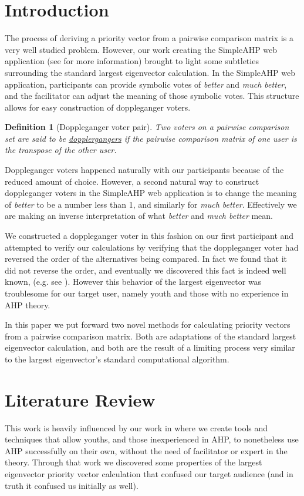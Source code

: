 \documentclass[11pt]{article}
\newtheorem{definition}{Definition}
\begin{document}
\section{Introduction}
The process of deriving a priority vector from a pairwise comparison matrix is a
very well studied problem.  However, our work creating the SimpleAHP web 
application (see \cite{adamsmont} for more information) brought to light some
subtleties surrounding the standard largest eigenvector calculation.
In the SimpleAHP web application, participants can provide symbolic votes
of \emph{better} and \emph{much better}, and the facilitator can adjust the
meaning of those symbolic votes.  This structure allows for easy construction
of doppleganger voters.
\begin{definition}[Doppleganger voter pair]
	Two voters on a pairwise comparison set are said to be \ul{dopplergangers} if
	the pairwise comparison matrix of one user is the transpose of the other user.
\end{definition}
Doppleganger voters happened naturally with our participants because of the
reduced amount of choice.  However, a second natural way to construct doppleganger
voters in the SimpleAHP web application is to change the meaning of \emph{better} 
to be a number less than 1, and similarly for \emph{much better}.  Effectively we
are making an inverse interpretation of what \emph{better} and \emph{much better} 
mean.

We constructed a doppleganger voter in this fashion on our first participant
and attempted to verify our calculations by verifying that the doppleganger voter
had reversed the order of the alternatives being compared.  In fact we found
that it did not reverse the order, and eventually we discovered this fact is
indeed well known, (e.g. see \cite{choo2004common}).  However this behavior
of the largest eigenvector was troublesome for our target user, namely youth
and those with no experience in AHP theory.

In this paper we put forward two novel methods for calculating priority
vectors from a pairwise comparison matrix.  Both are adaptations of the
standard largest eigenvector calculation, and both are the result of a limiting
process very similar to the largest eigenvector's standard computational
algorithm.

\section{Literature Review}
This work is heavily influenced by our work in \cite{adamsmont} where we create
tools and techniques that allow youths, and those inexperienced in AHP, to
nonetheless use AHP successfully on their own, without the need of 
facilitator or expert in the theory.  Through that work we discovered some
properties of the largest eigenvector priority vector calculation that
confused our target audience (and in truth it confused us initially as well).
\end{document}
